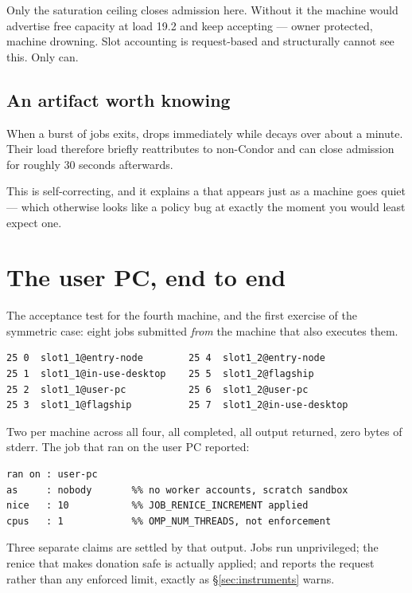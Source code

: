 \begin{keypoint}
Only the saturation ceiling closes admission here. Without it the machine would
advertise free capacity at load 19.2 and keep accepting --- owner protected,
machine drowning. Slot accounting is request-based and structurally cannot see
this. Only  can.
\end{keypoint}

\subsection{An artifact worth knowing}

When a burst of jobs exits,  drops immediately while
 decays over about a minute. Their load therefore briefly
reattributes to non-Condor and can close admission for roughly 30 seconds
afterwards.

This is self-correcting, and it explains a  that appears just as
a machine goes quiet --- which otherwise looks like a policy bug at exactly the
moment you would least expect one.

\section{The user PC, end to end}
\label{sec:userpc}

The acceptance test for the fourth machine, and the first exercise of the
symmetric case: eight jobs submitted \emph{from} the machine that also executes
them.

\begin{lstlisting}[style=term]
25 0  slot1_1@entry-node        25 4  slot1_2@entry-node
25 1  slot1_1@in-use-desktop    25 5  slot1_2@flagship
25 2  slot1_1@user-pc           25 6  slot1_2@user-pc
25 3  slot1_1@flagship          25 7  slot1_2@in-use-desktop
\end{lstlisting}

Two per machine across all four, all completed, all output returned, zero bytes
of stderr. The job that ran on the user PC reported:

\begin{lstlisting}[style=term]
ran on : user-pc
as     : nobody       %% no worker accounts, scratch sandbox
nice   : 10           %% JOB_RENICE_INCREMENT applied
cpus   : 1            %% OMP_NUM_THREADS, not enforcement
\end{lstlisting}

Three separate claims are settled by that output. Jobs run unprivileged; the
renice that makes donation safe is actually applied; and  reports the
request rather than any enforced limit, exactly as \S\ref{sec:instruments}
warns.

